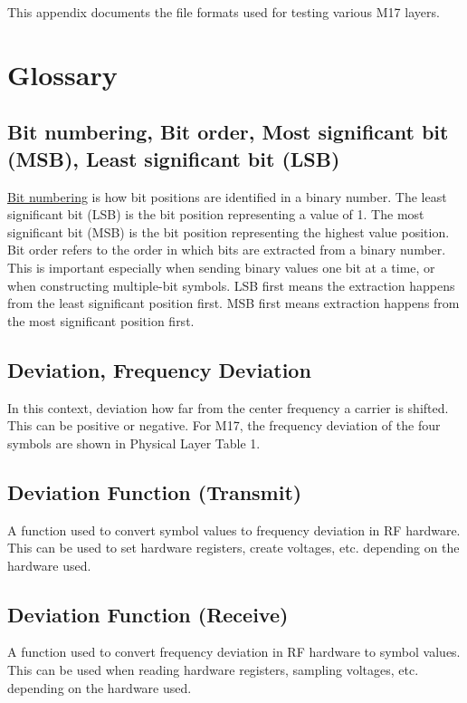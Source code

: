 \documentclass[a4paper,11pt,oneside]{book}
\begin{document}
This appendix documents the file formats used for testing various M17
layers.

\section{Glossary}

\subsection{Bit numbering, Bit order, Most significant bit (MSB), Least significant bit (LSB)}

\href{https://en.wikipedia.org/wiki/Bit_numbering}{Bit numbering} is how bit positions are identified in a binary number. The least significant bit (LSB) is the bit position representing a value of 1. The most significant bit (MSB) is the bit position representing the highest value position. Bit order refers to the order in which bits are extracted from a binary number. This is important especially when sending binary values one bit at a time, or when constructing multiple-bit symbols. LSB first means the extraction happens from the least significant position first. MSB first means extraction happens from the most significant position first.

\subsection{Deviation, Frequency Deviation}

In this context, deviation how far from the center frequency a carrier is shifted. This can be positive or negative. For M17, the frequency deviation of the four symbols are shown in Physical Layer Table 1.

\subsection{Deviation Function (Transmit)}

A function used to convert symbol values to frequency deviation in RF hardware. This can be used to set hardware registers, create voltages, etc. depending on the hardware used.

\subsection{Deviation Function (Receive)}

A function used to convert frequency deviation in RF hardware to symbol values. This can be used when reading hardware registers, sampling voltages, etc. depending on the hardware used.
\end{document}
